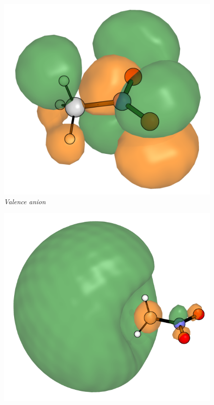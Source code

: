 \begin{figure}[h]
  \centering
  \begin{minipage}[b]{0.27\textwidth}
    \centering
    \includegraphics[width=\textwidth]{chapters/introduction/image/MeNO2_VBS.png}
    \small\emph{Valence anion}
  \end{minipage}
  \hfill
  \begin{minipage}[b]{0.30\textwidth}
    \centering
    \includegraphics[width=\textwidth]{chapters/introduction/image/MeNO2_DBS.png}

\end{minipage}
\end{figure}
